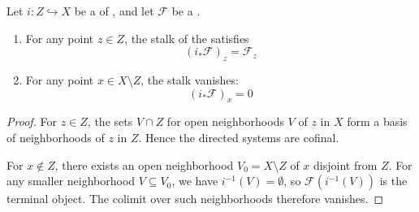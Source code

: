 \begin{proposition} \label{proposition:stalk_of_direct_image_under_closed_embedding_on_topological_space}
    Let $i : Z \hookrightarrow X$ be a  of , and let $\mathcal{F}$ be a .

    \begin{enumerate}
        \item For any point $z \in Z$, the stalk of the  satisfies
        $$(i_*\mathcal{F})_z = \mathcal{F}_z$$

        \item For any point $x \in X \setminus Z$, the stalk vanishes:
        $$(i_*\mathcal{F})_x = 0$$
    \end{enumerate}
\end{proposition}
\begin{proof}
    For $z \in Z$, the sets $V \cap Z$ for open neighborhoods $V$ of $z$ in $X$ form a basis of neighborhoods of $z$ in $Z$. Hence the directed systems are cofinal.

    For $x \notin Z$, there exists an open neighborhood $V_0 = X \setminus Z$ of $x$ disjoint from $Z$. For any smaller neighborhood $V \subseteq V_0$, we have $i^{-1}(V) = \emptyset$, so $\mathcal{F}(i^{-1}(V))$ is the terminal object. The colimit over such neighborhoods therefore vanishes.
\end{proof}

